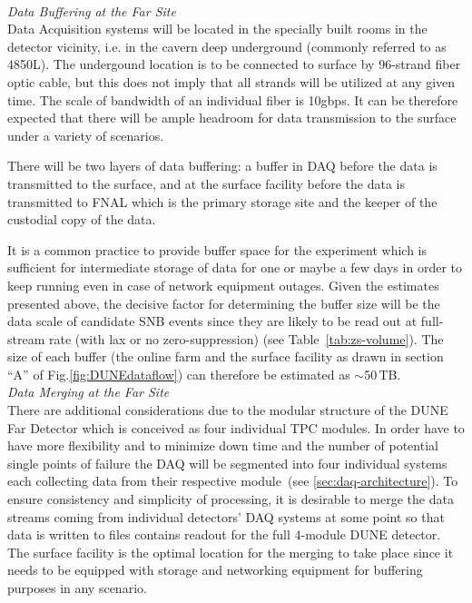 \ 
\\

\noindent
\textit{Data Buffering at the Far Site} 
\ 
\\
\noindent
Data Acquisition systems will be located in the specially built rooms in the detector vicinity,
i.e. in the cavern deep underground (commonly referred to as 4850L). The undergound location is to be
connected to surface by 96-strand fiber optic cable, but this does not imply that all strands will be
utilized at any given time. The scale of bandwidth of an individual fiber is 10gbps. It can be therefore
expected that there will be ample headroom for data transmission to the surface under a variety of scenarios.

There will be two layers of data buffering: a buffer in DAQ before the data is transmitted to the surface,
and at the surface facility before the data is transmitted to FNAL which is the primary storage site and the
keeper of the custodial copy of the data.

It is a common practice to provide buffer space for the experiment which is sufficient for intermediate storage of data
for one or maybe a few days in order to keep running even in case of network equipment outages. Given the estimates
presented above, the decisive factor for determining the buffer size will be the data scale of candidate SNB events since
they are likely to be read out at full-stream rate (with lax or no zero-suppression) (see Table~\ref{tab:zs-volume}). The
size of each buffer (the online farm and the surface facility as drawn in section ``A'' of Fig.\ref{fig:DUNEdataflow})
can therefore be estimated as $\sim$50\,TB.
\ 
\\

\noindent
\textit{Data Merging at the Far Site} 
\ 
\\
\noindent
There are additional considerations due to the modular structure of the DUNE Far Detector
which is conceived as four individual TPC modules. In order have to have more flexibility and to minimize down time
and the number of potential single points of failure the DAQ will be segmented into four individual  systems each collecting
data from their respective module~(see \ref{sec:daq-architecture}). To ensure
consistency and simplicity of processing, it is desirable to merge the data streams coming from individual
detectors' DAQ systems at some point so that data is written to files contains readout for the full 4-module
DUNE detector. The surface facility is the optimal location for the merging to take place since it needs to be
equipped with storage and networking equipment for buffering purposes in any scenario.

